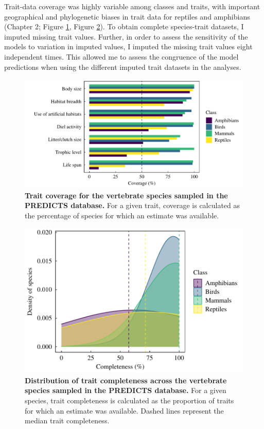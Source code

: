 Trait-data coverage was highly variable among classes and traits, with important geographical and phylogenetic biases in trait data for reptiles and amphibians (Chapter 2; Figure \ref{SI3_F4}, Figure \ref{SI3_F5}). To obtain complete species-trait datasets, I imputed missing trait values. Further, in order to assess the sensitivity of the models to variation in imputed values, I imputed the missing trait values eight independent times. This allowed me to assess the congruence of the model predictions when using the different imputed trait datasets in the analyses. 

\begin{figure}[h!]
\centering
\includegraphics[scale=0.8]{Supporting/Chapter3/Figures/SI_coverage}
\caption[Trait coverage for the vertebrate species sampled in the PREDICTS database]{\textbf{Trait coverage for the vertebrate species sampled in the PREDICTS database.} For a given trait, coverage is calculated as the percentage of species for which an estimate was available.}
\label{SI3_F4}
\end{figure}

\begin{figure}[h!]
\centering
\includegraphics[scale=0.8]{Supporting/Chapter3/Figures/SI_completeness}
\caption[Distribution of trait completeness across the vertebrate species sampled in the PREDICTS database]{\textbf{Distribution of trait completeness across the vertebrate species sampled in the PREDICTS database.} For a given species, trait completeness is calculated as the proportion of traits for which an estimate was available. Dashed lines represent the median trait completeness.}
\label{SI3_F5}
\end{figure}


